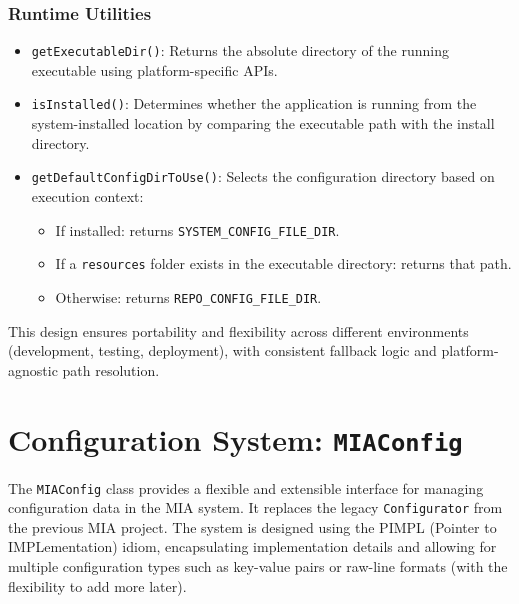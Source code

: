 \subsubsection*{Runtime Utilities}
\begin{itemize}
	\item \texttt{getExecutableDir()}: Returns the absolute directory of the running executable using platform-specific APIs.
	
	\item \texttt{isInstalled()}: Determines whether the application is running from the system-installed location by comparing the executable path with the install directory.
	
	\item \texttt{getDefaultConfigDirToUse()}: Selects the configuration directory based on execution context:
	\begin{itemize}
		\item If installed: returns \texttt{SYSTEM\_CONFIG\_FILE\_DIR}.
		\item If a \texttt{resources} folder exists in the executable directory: returns that path.
		\item Otherwise: returns \texttt{REPO\_CONFIG\_FILE\_DIR}.
	\end{itemize}
\end{itemize}

This design ensures portability and flexibility across different environments (development, testing, deployment), with consistent fallback logic and platform-agnostic path resolution.




















\section{Configuration System: \texttt{MIAConfig}}

The \texttt{MIAConfig} class provides a flexible and extensible interface for managing configuration data in the MIA system. It replaces the legacy \texttt{Configurator} from the previous MIA project. The system is designed using the PIMPL (Pointer to IMPLementation) idiom, encapsulating implementation details and allowing for multiple configuration types such as key-value pairs or raw-line formats (with the flexibility to add more later).

